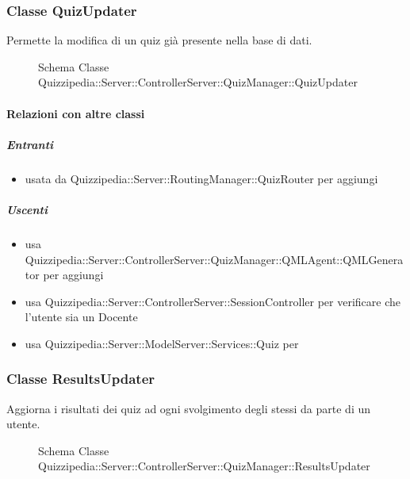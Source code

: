 \subsubsection{Classe QuizUpdater}
Permette la modifica di un quiz già presente nella base di dati.
\begin{figure}[H]
\centering
\noindent{}
\caption[Schema Classe QuizUpdater]{Schema Classe Quizzipedia::Server::ControllerServer::QuizManager::QuizUpdater}
\end{figure}
\paragraph{Relazioni con altre classi}
\subparagraph{Entranti}
\begin{itemize}
\item usata da Quizzipedia::Server::RoutingManager::QuizRouter per aggiungi
\end{itemize}
\subparagraph{Uscenti}
\begin{itemize}
\item usa Quizzipedia::Server::ControllerServer::QuizManager::QMLAgent::QMLGenerator per aggiungi
\item usa Quizzipedia::Server::ControllerServer::SessionController per verificare che l'utente sia un Docente
\item usa Quizzipedia::Server::ModelServer::Services::Quiz per 
\end{itemize}
\subsubsection{Classe ResultsUpdater}
Aggiorna i risultati dei quiz ad ogni svolgimento degli stessi da parte di un utente.
\begin{figure}[H]
\centering
\noindent{}
\caption[Schema Classe ResultsUpdater]{Schema Classe Quizzipedia::Server::ControllerServer::QuizManager::ResultsUpdater}
\end{figure}
